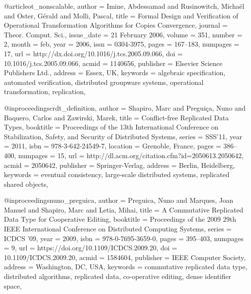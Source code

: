 @article{ot_nonscalable,
 author = {Imine, Abdessamad and Rusinowitch, Micha\"{e}l and Oster, G{\'e}rald and Molli, Pascal},
 title = {Formal Design and Verification of Operational Transformation Algorithms for Copies Convergence},
 journal = {Theor. Comput. Sci.},
 issue_date = {21 February 2006},
 volume = {351},
 number = {2},
 month = feb,
 year = {2006},
 issn = {0304-3975},
 pages = {167--183},
 numpages = {17},
 url = {http://dx.doi.org/10.1016/j.tcs.2005.09.066},
 doi = {10.1016/j.tcs.2005.09.066},
 acmid = {1140656},
 publisher = {Elsevier Science Publishers Ltd.},
 address = {Essex, UK},
 keywords = {algebraic specification, automated verification, distributed groupware systems, operational transformation, replication},
}

@inproceedings{crdt_definition,
 author = {Shapiro, Marc and Pregui\c{c}a, Nuno and Baquero, Carlos and Zawirski, Marek},
 title = {Conflict-free Replicated Data Types},
 booktitle = {Proceedings of the 13th International Conference on Stabilization, Safety, and Security of Distributed Systems},
 series = {SSS'11},
 year = {2011},
 isbn = {978-3-642-24549-7},
 location = {Grenoble, France},
 pages = {386--400},
 numpages = {15},
 url = {http://dl.acm.org/citation.cfm?id=2050613.2050642},
 acmid = {2050642},
 publisher = {Springer-Verlag},
 address = {Berlin, Heidelberg},
 keywords = {eventual consistency, large-scale distributed systems, replicated shared objects},
} 

@inproceedings{nuno_preguica,
 author = {Preguica, Nuno and Marques, Joan Manuel and Shapiro, Marc and Letia, Mihai},
 title = {A Commutative Replicated Data Type for Cooperative Editing},
 booktitle = {Proceedings of the 2009 29th IEEE International Conference on Distributed Computing Systems},
 series = {ICDCS '09},
 year = {2009},
 isbn = {978-0-7695-3659-0},
 pages = {395--403},
 numpages = {9},
 url = {https://doi.org/10.1109/ICDCS.2009.20},
 doi = {10.1109/ICDCS.2009.20},
 acmid = {1584604},
 publisher = {IEEE Computer Society},
 address = {Washington, DC, USA},
 keywords = {commutative replicated data type, distributed algorithms, replicated data, co-operative editing, dense identifier space},
} 